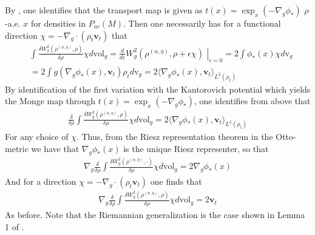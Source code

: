 \documentclass[reqno,11pt,letterpaper]{amsart}
\theoremstyle{plain}
\theoremstyle{definition}
\theoremstyle{remark}
\newcommand{\mb}{\mathbf}
\newcommand{\vol}{\mathrm{v}_{g}}
\begin{document}
By \cite{McCann2001}, one identifies that the transport map is given as $t(x) = \exp_{x} (- \nabla_{g} \phi_{*})$ $\rho$-a.e. $x$ for densities in ${P}_{ac}(M)$. Then one necessarily has for a functional direction $\chi = - \nabla_{g} \cdot (\rho_{t} \mb{v}_{t})$ that
\begin{align*}
    &\int \frac{\delta W_{2}^{2}(\rho^{(n,\eta)}, \rho)}{\delta \rho} \chi d \mathrm{vol}_{g} = \frac{d}{d\epsilon} \left.  W_{g}^{2}(\rho^{(n,\eta)}, \rho + \epsilon \chi) \,\, \right|_{\epsilon = 0} = 2 \int \phi_{*}(x) \chi d\vol \\
    &= 2 \int g( \nabla_{g}\phi_{*}(x), \mb{v}_{t}) \rho_{t} d\vol = 2\langle \nabla_{g}\phi_{*}(x), \mb{v}_{t} \rangle_{L^{2}(\rho_{t})}
\end{align*}
By identification of the first variation with the Kantorovich potential which yields the Monge map through $t(x) = \exp_{x} (- \nabla_{g} \phi_{*})$, one identifies from above that
\begin{align*}
    \frac{\delta}{\delta \rho}\int \frac{\delta W_{g}^{2}(\rho^{(n,\eta)}, \rho)}{\delta \rho} \chi d \mathrm{vol}_{g} = 2 \langle \nabla_{g}\phi_{*}(x), \mb{v}_{t} \rangle_{L^{2}(\rho_{t})}
\end{align*}
For any choice of $\chi$. Thus, from the Riesz representation theorem in the Otto-metric we have that $\nabla_{g}\phi_{*}(x)$ is the unique Riesz representer, so that 
\begin{align*}
    \nabla_{g}\frac{\delta}{\delta \rho}\int \frac{\delta W_{g}^{2}(\rho^{(n,\eta)}, \cdot)}{\delta \rho} \chi d \mathrm{vol}_{g} = 2\nabla_{g}\phi_{*}(x)
\end{align*}
And for a direction $\chi = - \nabla_{g} \cdot (\rho_{t} \mb{v}_{t})$ one finds that \begin{align*}
    \nabla_{g}\frac{\delta}{\delta \rho}\int \frac{\delta W_{g}^{2}(\rho^{(n,\eta)}, \rho)}{\delta \rho} \chi d \mathrm{vol}_{g} = 2\mb{v}_{t}
\end{align*}
As before. Note that the Riemannian generalization is the case shown in Lemma 1 of \cite{Lott2007}.
\end{document}
